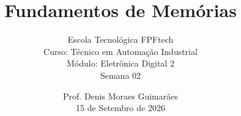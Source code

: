 
\title{Fundamentos de Memórias}

\subtitle{\texorpdfstring{%
Escola Tecnológica FPFtech\\[0.3cm]
Curso: Técnico em Automação Industrial\\[0.3cm]
Módulo: Eletrônica Digital 2\\[0.2cm]
Semana 02
}{Escola Tecnológica FPFtech — Curso: Técnico em Automação Industrial — Módulo: Eletrônica Digital 2}}

\author{\texorpdfstring{%
Prof. Denis Moraes Guimarães\\
\small 15 de Setembro de 2026
}{Prof. Denis Moraes Guimarães}}

\date{}
